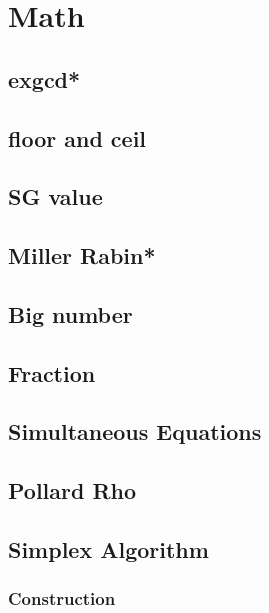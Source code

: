 \section{Math}
\subsection{exgcd*} %

\subsection{floor and ceil}

\subsection{SG value}

% 
\subsection{Miller Rabin*} %

\subsection{Big number}

\subsection{Fraction}

\subsection{Simultaneous Equations}

\subsection{Pollard Rho}

\subsection{Simplex Algorithm}

\subsubsection{Construction}

